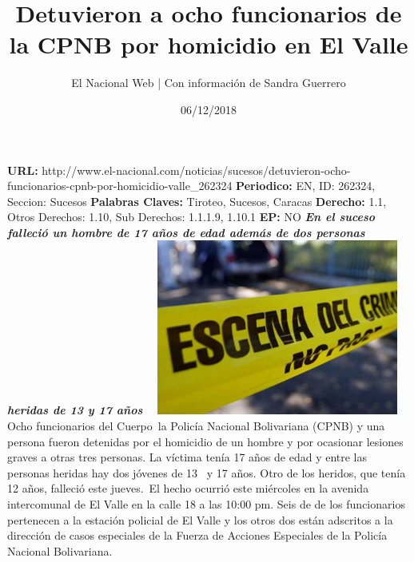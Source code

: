 \documentclass{article}%
\title{\textbf{Detuvieron a ocho funcionarios de la CPNB por homicidio en El Valle}}%
\author{El Nacional Web | Con información de Sandra Guerrero}%
\date{06/12/2018}%
\begin{document}
%
\normalsize%
\maketitle%
\textbf{URL: }%
http://www.el{-}nacional.com/noticias/sucesos/detuvieron{-}ocho{-}funcionarios{-}cpnb{-}por{-}homicidio{-}valle\_262324\newline%
%
\textbf{Periodico: }%
EN, %
ID: %
262324, %
Seccion: %
Sucesos\newline%
%
\textbf{Palabras Claves: }%
Tiroteo, Sucesos, Caracas\newline%
%
\textbf{Derecho: }%
1.1, %
Otros Derechos: %
1.10, %
Sub Derechos: %
1.1.1.9, 1.10.1\newline%
%
\textbf{EP: }%
NO\newline%
\newline%
%
\textbf{\textit{En el suceso falleció un hombre de 17 años de edad además de dos personas heridas de 13 y 17 años ~}}%
\newline%
\newline%
%
\includegraphics[width=300px]{16.jpg}%
\newline%
%
Ocho funcionarios del Cuerpo~la Policía Nacional Bolivariana (CPNB) y una persona fueron detenidas por el homicidio de un hombre y por ocasionar lesiones graves a otras tres personas.%
\newline%
%
La víctima tenía 17 años de edad y entre las personas heridas hay dos jóvenes de 13~ y 17 años. Otro de los heridos, que tenía 12 años, falleció este jueves.~El hecho ocurrió este miércoles en la avenida intercomunal de El Valle en la calle 18 a las 10:00 pm.%
\newline%
%
Seis de de los funcionarios pertenecen a la estación policial de El Valle y los otros dos están adscritos a la dirección de casos especiales de la Fuerza de Acciones Especiales de la Policía Nacional Bolivariana.%
\newline%
%
\end{document}

